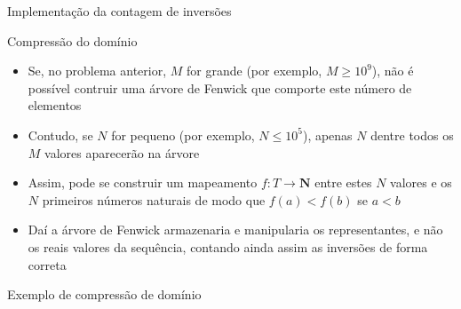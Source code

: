 \begin{frame}[fragile]{Implementação da contagem de inversões}
\end{frame}

\begin{frame}[fragile]{Compressão do domínio}

    \begin{itemize}
        \item Se, no problema anterior, $M$ for grande (por exemplo, $M \geq 10^9$), não é
            possível contruir uma árvore de Fenwick que comporte este número de elementos

        \item Contudo, se $N$ for pequeno (por exemplo, $N \leq 10^5$), apenas $N$ dentre todos
            os $M$ valores aparecerão na árvore

        \item Assim, pode se construir um mapeamento $f : T \to \mathbf{N}$ entre estes $N$ 
            valores e os $N$ primeiros números naturais de modo que $f(a) < f(b)$ se $a < b$

        \item Daí a árvore de Fenwick armazenaria e manipularia os representantes, e não os
            reais valores da sequência, contando ainda assim as inversões de forma correta
    \end{itemize}

\end{frame}

\begin{frame}[fragile]{Exemplo de compressão de domínio}
\end{frame}
